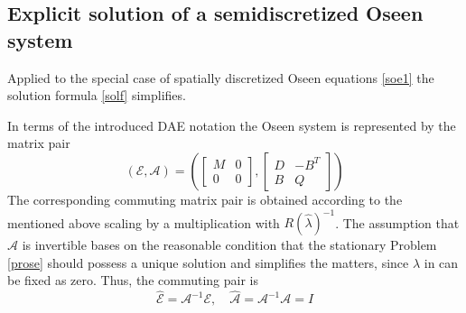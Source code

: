 \documentclass[a4paper,10pt,BCOR=15mm]{scrbook}
\begin{document}
\subsection{Explicit solution of a semidiscretized Oseen system}

Applied to the special case of spatially discretized Oseen equations \eqref{soe1} the solution formula \eqref{solf} simplifies.

In terms of the introduced DAE notation the Oseen system is represented by the matrix pair
\begin{equation}\label{osco}
 (\mathcal{E},\mathcal{A}) = \left(\begin{bmatrix} M& 0 \\ 0& 0 \end{bmatrix} ,\begin{bmatrix} D&  -B^T  \\ B&  Q \end{bmatrix} \right)
\end{equation}
The corresponding commuting matrix pair is obtained according to the mentioned above scaling by a multiplication with $R(\hat \lambda)^{-1}$. The assumption that $\mathcal{A}$ is invertible bases on the reasonable condition that the stationary Problem \ref{prose} should possess a unique solution and simplifies the matters, since $\hat \lambda$ in can be fixed as zero. Thus, the commuting pair is
\begin{equation}\label{scal}
 \hat{\mathcal{E}}=\mathcal{A}^{-1}\mathcal{E}, \quad \hat{\mathcal{A}}=\mathcal{A}^{-1}\mathcal{A}=I
\end{equation}
\end{document}
